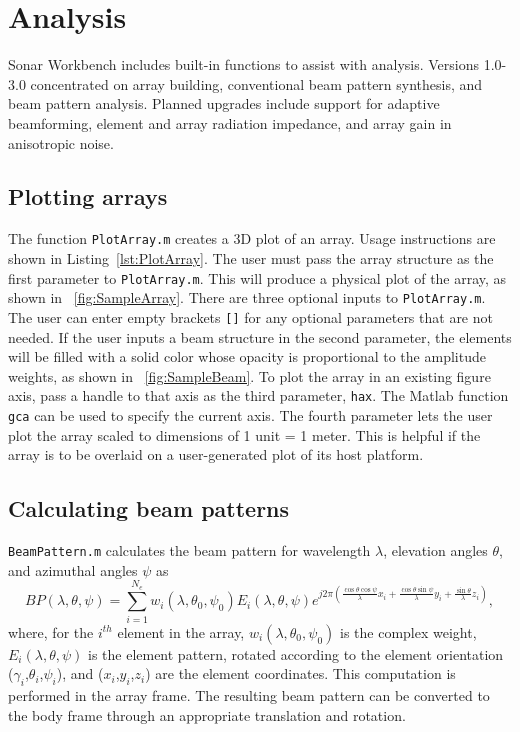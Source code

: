\chapter{Analysis}\label{ch:analysis}

Sonar Workbench includes built-in functions to assist with analysis.  Versions 1.0-3.0 concentrated on array building, conventional beam pattern synthesis, and beam pattern analysis.  Planned upgrades include support for adaptive beamforming, element and array radiation impedance, and array gain in anisotropic noise.

\section{Plotting arrays}

The function \texttt{PlotArray.m} creates a 3D plot of an array. Usage instructions are shown in Listing~\ref{lst:PlotArray}. The user must pass the array structure as the first parameter to \texttt{PlotArray.m}. This will produce a physical plot of the array, as shown in \figname~\ref{fig:SampleArray}. There are three optional inputs to \texttt{PlotArray.m}. The user can enter empty brackets \texttt{[]} for any optional parameters that are not needed. If the user inputs a beam structure in the second parameter, the elements will be filled with a solid color whose opacity is proportional to the amplitude weights, as shown in \figname~\ref{fig:SampleBeam}. To plot the array in an existing figure axis, pass a handle to that axis as the third parameter, \texttt{hax}. The Matlab function \texttt{gca} can be used to specify the current axis. The fourth parameter lets the user plot the array scaled to dimensions of 1 unit = 1 meter. This is helpful if the array is to be overlaid on a user-generated plot of its host platform. 

\newpage

 
\section{Calculating beam patterns}

\texttt{BeamPattern.m} calculates the beam pattern for wavelength $\lambda$, elevation angles $\theta$, and azimuthal angles $\psi$ as
\begin{equation}
BP(\lambda,\theta,\psi) = \sum_{i=1}^{N_e} w_i(\lambda,\theta_0,\psi_0)E_i(\lambda,\theta,\psi)e^{j2\pi\left(\frac{\cos\theta\cos\psi}{\lambda}x_i + \frac{\cos\theta\sin\psi}{\lambda}y_i + \frac{\sin\theta}{\lambda}z_i\right)},
\end{equation}
where, for the $i^{th}$ element in the array, $w_i(\lambda,\theta_0,\psi_0)$ is the complex weight, $E_i(\lambda,\theta,\psi)$ is the element pattern, rotated according to the element orientation ($\gamma_i$,$\theta_i$,$\psi_i$), and ($x_i$,$y_i$,$z_i$) are the element coordinates. This computation is performed in the array frame. The resulting beam pattern can be converted to the body frame through an appropriate translation and rotation.

